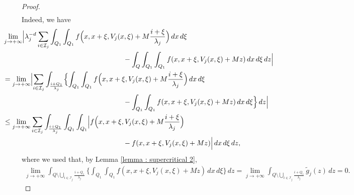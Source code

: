 \documentclass{article}
\theoremstyle{definition}
\begin{document}
\begin{proof}
\begin{multline}
\end{multline}
Indeed, we have
\begin{align}\notag
    & \hspace{-1cm}\lim_{j\to+\infty} \Bigl| \lambda_j^{-d} \sum_{i\in \mathcal{I}_j}\int_{Q_1} \int_{Q_1} f\Bigl(x,x+\xi,V_j(x,\xi)+ M\frac{i+\xi}{\lambda_j}\Bigr)\, dx\,d\xi \\ \notag
    & \hspace{5cm} -\int_Q\int_{Q_1} \int_{Q_1} f(x,x+\xi,V_j(x,\xi)+Mz)\,dx \, d\xi\, dz \Bigr|\\ \notag
    & \hspace{-1cm} = \lim_{j\to+\infty} \Bigl|\sum_{i\in \mathcal{I}_j} \int_{\frac{i+Q_1}{\lambda_j}} \Bigl\{\int_{Q_1}  \int_{Q_1} f\Bigl(x,x+\xi,V_j(x,\xi)+ M\frac{i+\xi}{\lambda_j}\Bigr)\, dx\,d\xi \\ \notag 
    & \hspace{5cm} - \int_{Q_1} \int_{Q_1} f(x,x+\xi,V_j(x,\xi)+Mz)\,dx\, d\xi \Bigr\}\, dz \Bigr| \\  \notag
    & \hspace{-1cm} \leq \lim_{j\to+\infty} \sum_{i\in \mathcal{I}_j} \int_{\frac{i+Q_1}{\lambda_j}}\int_{Q_1}\int_{Q_1}\Bigl|f\Bigl(x,x+\xi,V_j(x,\xi) + M\frac{i+\xi}{\lambda_j}\Bigr) \\ \label{superclaim-1}
    & \hspace{5cm}-f(x,x+\xi,V_j(x,\xi)+Mz)\Bigr|\,dx\,d\xi\,dz,
\end{align}
where we used that, by Lemma \ref{lemma : supercritical 2},
\begin{align*}
     \lim_{j\to+\infty} \int_{Q\setminus \bigcup_{i\in\mathcal{I}_j} \frac{i+Q_1}{\lambda_j} }\Bigr\{\int_{Q_1} \int_{Q_1} f(x,x+\xi,V_j(x,\xi)+Mz)\,dx\, d\xi \Bigr\}\, dz = \lim_{j\to+\infty} \int_{Q\setminus \bigcup_{i\in\mathcal{I}_j} \frac{i+Q_1}{\lambda_j} } \widetilde{g}_j(z)\,dz=0.
\end{align*}



\end{proof}
\end{document}
